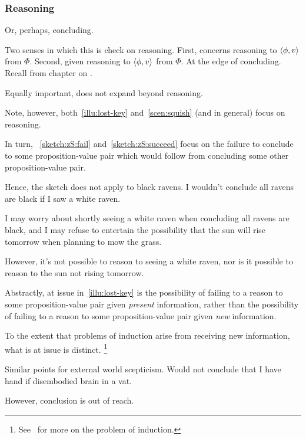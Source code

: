 \subsubsection{Reasoning}

\begin{note}
  Or, perhaps, concluding.
\end{note}

\begin{note}
  Two senses in which this is check on reasoning.
  First, concerns reasoning to \(\langle \phi, v \rangle\) from \(\Phi\).
  Second, given reasoning to \(\langle \phi, v \rangle\) from \(\Phi\).
  At the edge of concluding.
  Recall from chapter on .
\end{note}

\begin{note}
  Equally important, does not expand beyond reasoning.
\end{note}

\begin{note}
  Note, however, both~\autoref{illu:lost-key} and~\autoref{scen:squish} (and  in general) focus on reasoning.

  In turn, ~\ref{sketch:zS:fail} and~\ref{sketch:zS:succeed} focus on the failure to conclude to some proposition-value pair which would follow from concluding some other proposition-value pair.

  Hence, the sketch does not apply to black ravens.
  I wouldn't conclude all ravens are black if I saw a white raven.

  I may worry about shortly seeing a white raven when concluding all ravens are black, and I may refuse to entertain the possibility that the sun will rise tomorrow when planning to mow the grass.

  However, it's not possible to reason to seeing a white raven, nor is it possible to reason to the sun not rising tomorrow.

  Abstractly, at issue in~\autoref{illu:lost-key} is the possibility of failing to a reason to some proposition-value pair given \emph{present} information, rather than the possibility of failing to a reason to some proposition-value pair given \emph{new} information.

  To the extent that problems of induction arise from receiving new information, what is at issue is distinct.%
  \footnote{
    See~\textcite{Henderson:2020wb} for more on the problem of induction.
  }

  Similar points for external world scepticism.
  Would not conclude that I have hand if disembodied brain in a vat.

  However, conclusion is out of reach.
\end{note}


